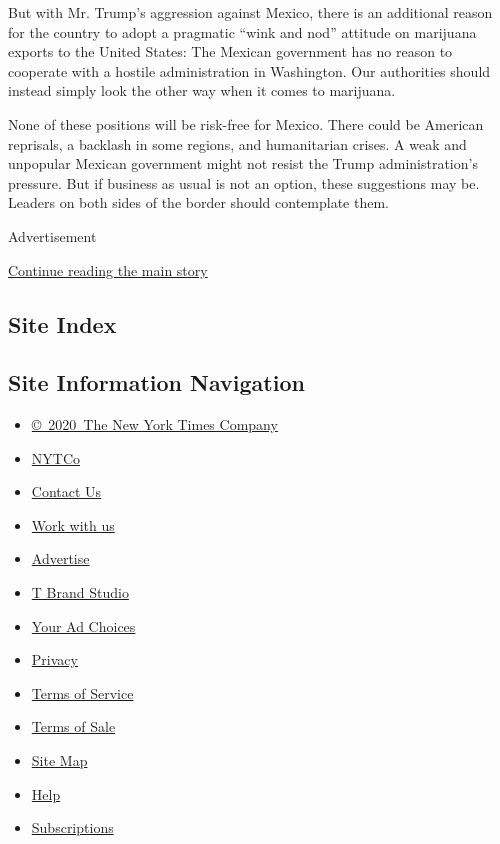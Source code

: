 But with Mr. Trump's aggression against Mexico, there is an additional
reason for the country to adopt a pragmatic ``wink and nod'' attitude on
marijuana exports to the United States: The Mexican government has no
reason to cooperate with a hostile administration in Washington. Our
authorities should instead simply look the other way when it comes to
marijuana.

None of these positions will be risk-free for Mexico. There could be
American reprisals, a backlash in some regions, and humanitarian crises.
A weak and unpopular Mexican government might not resist the Trump
administration's pressure. But if business as usual is not an option,
these suggestions may be. Leaders on both sides of the border should
contemplate them.

Advertisement

\protect\hyperlink{after-bottom}{Continue reading the main story}

\hypertarget{site-index}{%
\subsection{Site Index}\label{site-index}}

\hypertarget{site-information-navigation}{%
\subsection{Site Information
Navigation}\label{site-information-navigation}}

\begin{itemize}
\tightlist
\item
  \href{https://help.nytimes.com/hc/en-us/articles/115014792127-Copyright-notice}{©~2020~The
  New York Times Company}
\end{itemize}

\begin{itemize}
\tightlist
\item
  \href{https://www.nytco.com/}{NYTCo}
\item
  \href{https://help.nytimes.com/hc/en-us/articles/115015385887-Contact-Us}{Contact
  Us}
\item
  \href{https://www.nytco.com/careers/}{Work with us}
\item
  \href{https://nytmediakit.com/}{Advertise}
\item
  \href{http://www.tbrandstudio.com/}{T Brand Studio}
\item
  \href{https://www.nytimes.com/privacy/cookie-policy\#how-do-i-manage-trackers}{Your
  Ad Choices}
\item
  \href{https://www.nytimes.com/privacy}{Privacy}
\item
  \href{https://help.nytimes.com/hc/en-us/articles/115014893428-Terms-of-service}{Terms
  of Service}
\item
  \href{https://help.nytimes.com/hc/en-us/articles/115014893968-Terms-of-sale}{Terms
  of Sale}
\item
  \href{https://spiderbites.nytimes.com}{Site Map}
\item
  \href{https://help.nytimes.com/hc/en-us}{Help}
\item
  \href{https://www.nytimes.com/subscription?campaignId=37WXW}{Subscriptions}
\end{itemize}
